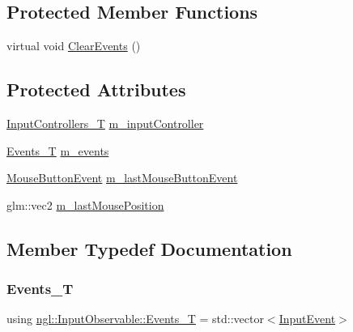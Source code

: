 \subsection*{Protected Member Functions}
\begin{DoxyCompactItemize}
\item 
virtual void \mbox{\hyperlink{classngl_1_1_input_observable_ab102e0d920a8a52676b87b8973488c7a}{Clear\+Events}} ()
\end{DoxyCompactItemize}
\subsection*{Protected Attributes}
\begin{DoxyCompactItemize}
\item 
\mbox{\hyperlink{classngl_1_1_input_observable_af9093ebff6abe79d8fd814aab1437416}{Input\+Controllers\+\_\+T}} \mbox{\hyperlink{classngl_1_1_input_observable_a35853e216cb2228f79504aaa7c7a4fd9}{m\+\_\+input\+Controller}}
\item 
\mbox{\hyperlink{classngl_1_1_input_observable_acab630eaf545f2bba70717111bede255}{Events\+\_\+T}} \mbox{\hyperlink{classngl_1_1_input_observable_a638fe7100db67ace66ea56c34d70748d}{m\+\_\+events}}
\item 
\mbox{\hyperlink{structngl_1_1_mouse_button_event}{Mouse\+Button\+Event}} \mbox{\hyperlink{classngl_1_1_input_observable_aadb9e6305b7a3c02fe6128a95d247451}{m\+\_\+last\+Mouse\+Button\+Event}}
\item 
glm\+::vec2 \mbox{\hyperlink{classngl_1_1_input_observable_a2f212cfa55ce13206cc4d9a5a0505fe1}{m\+\_\+last\+Mouse\+Position}}
\end{DoxyCompactItemize}


\subsection{Member Typedef Documentation}
\mbox{\label{classngl_1_1_input_observable_acab630eaf545f2bba70717111bede255}} 
\subsubsection{\texorpdfstring{Events\+\_\+T}{Events\_T}}
{\footnotesize\ttfamily using \mbox{\hyperlink{classngl_1_1_input_observable_acab630eaf545f2bba70717111bede255}{ngl\+::\+Input\+Observable\+::\+Events\+\_\+T}} =  std\+::vector$<$\mbox{\hyperlink{structngl_1_1_input_event}{Input\+Event}}$>$}

